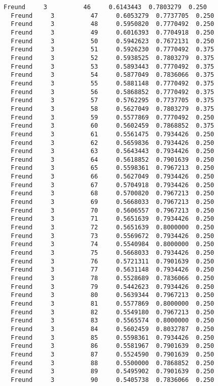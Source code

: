 \documentclass[11pt]{article}
\begin{document}
\begin{Verbatim}[commandchars=\\\{\}]
  Freund     3          46     0.6143443  0.7803279  0.250
  Freund     3          47     0.6053279  0.7737705  0.250
  Freund     3          48     0.5950820  0.7770492  0.250
  Freund     3          49     0.6016393  0.7704918  0.250
  Freund     3          50     0.5942623  0.7672131  0.250
  Freund     3          51     0.5926230  0.7770492  0.375
  Freund     3          52     0.5938525  0.7803279  0.375
  Freund     3          53     0.5893443  0.7770492  0.375
  Freund     3          54     0.5877049  0.7836066  0.375
  Freund     3          55     0.5881148  0.7770492  0.375
  Freund     3          56     0.5868852  0.7770492  0.375
  Freund     3          57     0.5762295  0.7737705  0.375
  Freund     3          58     0.5627049  0.7803279  0.375
  Freund     3          59     0.5577869  0.7770492  0.250
  Freund     3          60     0.5602459  0.7868852  0.375
  Freund     3          61     0.5561475  0.7934426  0.250
  Freund     3          62     0.5659836  0.7934426  0.250
  Freund     3          63     0.5643443  0.7934426  0.250
  Freund     3          64     0.5618852  0.7901639  0.250
  Freund     3          65     0.5598361  0.7967213  0.250
  Freund     3          66     0.5627049  0.7934426  0.250
  Freund     3          67     0.5704918  0.7934426  0.250
  Freund     3          68     0.5700820  0.7967213  0.250
  Freund     3          69     0.5668033  0.7967213  0.250
  Freund     3          70     0.5606557  0.7967213  0.250
  Freund     3          71     0.5651639  0.7934426  0.250
  Freund     3          72     0.5651639  0.8000000  0.250
  Freund     3          73     0.5569672  0.7934426  0.250
  Freund     3          74     0.5540984  0.8000000  0.250
  Freund     3          75     0.5668033  0.7934426  0.250
  Freund     3          76     0.5721311  0.7901639  0.250
  Freund     3          77     0.5631148  0.7934426  0.250
  Freund     3          78     0.5528689  0.7836066  0.250
  Freund     3          79     0.5442623  0.7934426  0.250
  Freund     3          80     0.5639344  0.7967213  0.250
  Freund     3          81     0.5577869  0.8000000  0.250
  Freund     3          82     0.5549180  0.7967213  0.250
  Freund     3          83     0.5565574  0.8000000  0.250
  Freund     3          84     0.5602459  0.8032787  0.250
  Freund     3          85     0.5598361  0.7934426  0.250
  Freund     3          86     0.5581967  0.7901639  0.250
  Freund     3          87     0.5524590  0.7901639  0.250
  Freund     3          88     0.5500000  0.7868852  0.250
  Freund     3          89     0.5495902  0.7901639  0.250
  Freund     3          90     0.5405738  0.7836066  0.250

\end{Verbatim}
\end{document}
